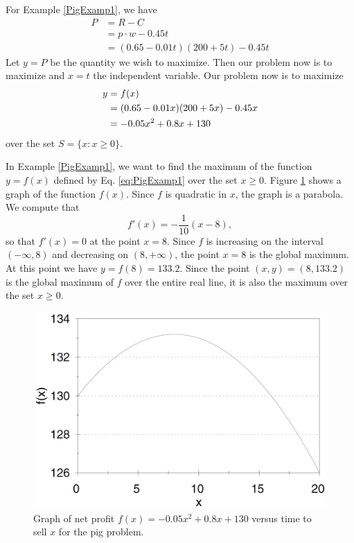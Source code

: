 For Example \ref{PigExamp1}, we have
\begin{align*}
P&=R-C\\
&=p\cdot w-0.45t\\
&=(0.65-0.01t)(200+5t)-0.45t
\end{align*}
Let $y=P$ be the quantity we wish to maximize. Then our problem now is to maximize and $x=t$ the independent variable. Our problem now is to maximize
\begin{align}
\notag y&=f(x)\\
\notag &=(0.65-0.01x)(200+5x)-0.45x\\
\label{eq:PigExamp1}&=-0.05x^2+0.8x+130
\end{align}
over the set $S=\{x:x\geq0\}$.

\vspace{1em}
\hspace{-1.5em}{\bf Step 4. Solve the model}

In Example \ref{PigExamp1}, we want to find the maximum of the function $y=f(x)$ defined by Eq. \eqref{eq:PigExamp1} over the set $x\geq0$. Figure \ref{fig1:PigExamp} shows a graph of the function $f(x)$. Since $f$ is quadratic in $x$, the graph is a parabola. We compute that
$$
f'(x)=-\frac{1}{10}(x-8),
$$
so that $f'(x)=0$ at the point $x=8$. Since $f$ is increasing on the interval $(-\infty,8)$ and decreasing on $(8,+\infty)$, the point $x=8$ is the global maximum. At this point we have $y=f(8)=133.2$. Since the point $(x,y)=(8,133.2)$ is the global maximum of $f$ over the entire real line, it is also the maximum over the set $x\geq0$.

\begin{figure}[htbp]
\centering
\includegraphics[scale=0.2]{figs/PigExampFig1.png}
\caption{Graph of net profit $f(x)=-0.05x^2+0.8x+130$ versus time to sell $x$ for the pig problem.}
\label{fig1:PigExamp}
\end{figure}

